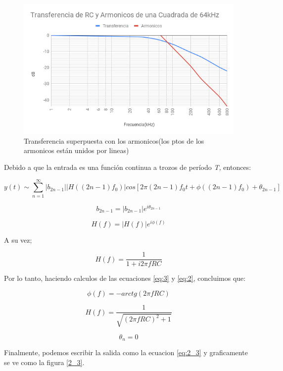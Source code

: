 \begin{figure}[h]
\begin{centering}
\includegraphics[scale=0.4]{../Ex2/resources2/Med_Arm}
\par\end{centering}
\caption{Transferencia superpuesta con los armonicos(los ptos de los armonicos
están unidos por lineas)}

\end{figure}

Debido a que la entrada es una función continua a trozos de período
\emph{T, }entonces:

\[
y(t)\sim\sum_{n=1}^{\infty}\left|b_{2n-1}\right|\left|H\left((2n-1)f_{0}\right)\right|cos\left[2\pi(2n-1)f_{0}t+\phi((2n-1)f_{0})+\theta_{2n-1}\right]
\]

\begin{equation}
b_{2n-1}=\left|b_{2n-1}\right|e^{i\theta_{2n-1}}\label{eq:3}
\end{equation}

\[
H(f)=\left|H(f)\right|e^{i\phi(f)}
\]

A su vez;

\begin{equation}
H(f)=\frac{1}{1+i2\pi fRC}\label{eq:2}
\end{equation}

Por lo tanto, haciendo calculos de las ecuaciones \ref{eq:3} y \ref{eq:2},
concluimos que:

\[
\phi(f)=-arctg(2\pi fRC)
\]

\[
H(f)=\frac{1}{\sqrt{(2\pi fRC)^{2}+1}}
\]

\[
\theta_{n}=0
\]

Finalmente, podemos escribir la salida como la ecuacion \ref{eq:2_3}
y graficamente se ve como la figura \ref{2_3}.

